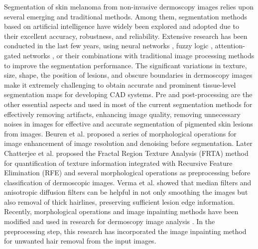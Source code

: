 \documentclass[review]{elsarticle}
\begin{document}
Segmentation of skin melanoma from non-invasive dermoscopy images relies upon several emerging and traditional methods. Among them, segmentation methods based on artificial intelligence have widely been explored and adopted due to their excellent accuracy, robustness, and reliability. Extensive research has been conducted in the last few years, using neural networks \cite{attia2017skin}, fuzzy logic \cite{garcia2019segmentation}, attention-gated networks \cite{wang2019automated}, or their combinations with traditional image processing methods to improve the segmentation performance. The significant variations in texture, size, shape, the position of lesions, and obscure boundaries in dermoscopy images make it extremely challenging to obtain accurate and prominent tissue-level segmentation maps for developing CAD systems. Pre and post-processing are the other essential aspects and used in most of the current segmentation methods \cite{chatterjee2019integration} for effectively removing artifacts, enhancing image quality, removing unnecessary noises in images for effective and accurate segmentation of pigmented skin lesions from images. Beuren et al. \cite{beuren2012skin} proposed a series of morphological operations for image enhancement of image resolution and denoising before segmentation. Later Chatterjee et al. \cite{chatterjee2019integration} proposed the Fractal Region Texture Analysis (FRTA) method for quantification of texture information integrated with Recursive Feature Elimination (RFE) and several morphological operations as preprocessing before classification of dermoscopic images. Verma et al. \cite{verma2015enhancement} showed that median filters and anisotropic diffusion filters can be helpful in not only smoothing the images but also removal of thick hairlines, preserving sufficient lesion edge information. Recently, morphological operations and image inpainting methods have been modified and used in research for dermoscopy image analysis \cite{salido2018using}. In the preprocessing step, this research has incorporated the image inpainting method for unwanted hair removal from the input images. 
\end{document}
